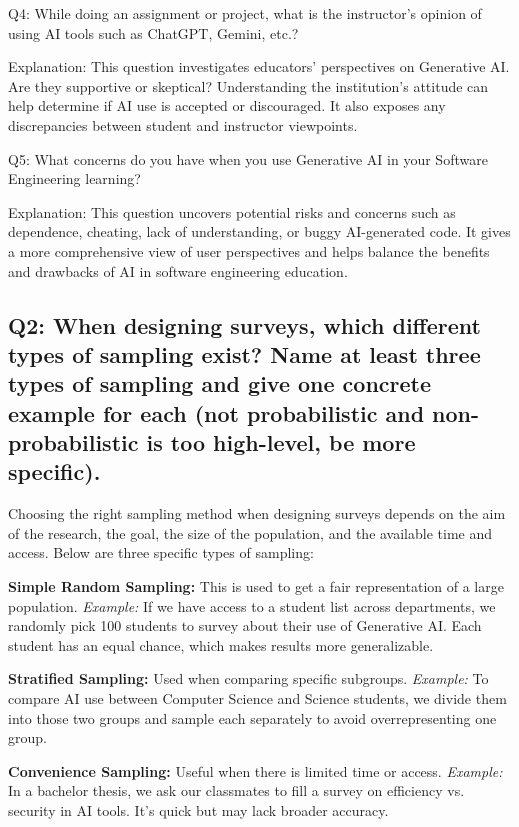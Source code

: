 Q4: While doing an assignment or project, what is the instructor's opinion of using AI tools such as ChatGPT, Gemini, etc.?

Explanation:
This question investigates educators' perspectives on Generative AI. Are they supportive or skeptical? Understanding the institution’s attitude can help determine if AI use is accepted or discouraged. It also exposes any discrepancies between student and instructor viewpoints.

Q5: What concerns do you have when you use Generative AI in your Software Engineering learning?

Explanation:
This question uncovers potential risks and concerns such as dependence, cheating, lack of understanding, or buggy AI-generated code. It gives a more comprehensive view of user perspectives and helps balance the benefits and drawbacks of AI in software engineering education.

\subsection*{Q2: When designing surveys, which different types of sampling exist? Name at least three types of sampling and give one concrete example for each (not probabilistic and non-probabilistic is too high-level, be more specific).}

Choosing the right sampling method when designing surveys depends on the aim of the research, the goal, the size of the population, and the available time and access. Below are three specific types of sampling:

\textbf{Simple Random Sampling:} This is used to get a fair representation of a large population.
\newline
\textit{Example:} If we have access to a student list across departments, we randomly pick 100 students to survey about their use of Generative AI. Each student has an equal chance, which makes results more generalizable.

\textbf{Stratified Sampling:} Used when comparing specific subgroups.
\newline
\textit{Example:} To compare AI use between Computer Science and Science students, we divide them into those two groups and sample each separately to avoid overrepresenting one group.

\textbf{Convenience Sampling:} Useful when there is limited time or access.
\newline
\textit{Example:} In a bachelor thesis, we ask our classmates to fill a survey on efficiency vs. security in AI tools. It’s quick but may lack broader accuracy.

